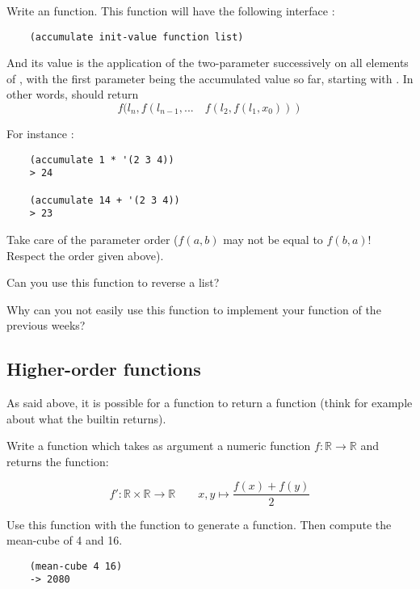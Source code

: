 \documentclass{../../../tp}
\begin{document}
\begin{instruction}
	Write an  function. This function will have the following interface :
	\begin{verbatim}
	(accumulate init-value function list)
	\end{verbatim}	
	
	And its value is the application of the two-parameter  successively on all elements of , with the first parameter being the accumulated value so far, starting with . In other words,  should return
	$$ f(l_n, f(l_{n-1}, ... \quad f(l_2, f(l_1, x_0))) $$
	
	For instance :
	\begin{verbatim}
	(accumulate 1 * '(2 3 4))
	> 24
	
	(accumulate 14 + '(2 3 4))
	> 23
	\end{verbatim}	
	
	Take care of the parameter order ($f(a,b)$ may not be equal to $f(b,a)$! Respect the order given above).
	
	Can you use this function to reverse a list? 
	
	Why can you not easily use this function to implement your  function of the previous weeks? 
\end{instruction}

	
\subsection{Higher-order functions}

As said above, it is possible for a function to return a function (think for example about what the  builtin returns). 

\begin{instruction}
	Write a function  which takes as argument a numeric function $f: \mathbb{R} \rightarrow \mathbb{R}$ and returns the function: 
	
	$$ f': \mathbb{R} \times \mathbb{R} \rightarrow \mathbb{R} \qquad  x,y  \mapsto  \frac{f(x) + f(y)}{2}$$
	
	
	Use this function with the  function to generate a  function. Then compute the mean-cube of 4 and 16.
	
	\begin{verbatim}
	(mean-cube 4 16)
	-> 2080
	\end{verbatim}
	
\end{instruction}
\end{document}
